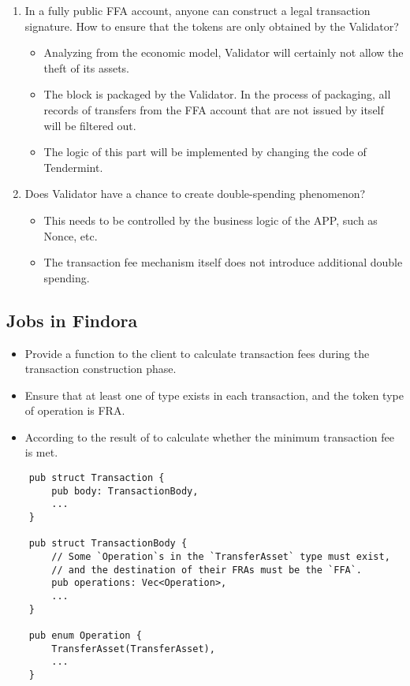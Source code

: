 \begin{enumerate}
    \item In a fully public FFA account, anyone can construct a legal transaction signature.
            How to ensure that the tokens are only obtained by the Validator?
        \begin{itemize}
            \item Analyzing from the economic model, Validator will certainly not allow the theft of its assets.
            \item The block is packaged by the Validator. In the process of packaging,
                    all records of transfers from the FFA account that are not issued by itself will be filtered out.
            \item The logic of this part will be implemented by changing the code of Tendermint.
        \end{itemize}
    \item Does Validator have a chance to create double-spending phenomenon?
        \begin{itemize}
            \item This needs to be controlled by the business logic of the APP, such as Nonce, etc.
            \item The transaction fee mechanism itself does not introduce additional double spending.
        \end{itemize}
\end{enumerate}

\subsection{Jobs in Findora}

\begin{itemize}
    \item Provide a function to the client to calculate transaction fees
            during the transaction construction phase.
    \item Ensure that at least one  of type 
            exists in each transaction, and the token type of operation is FRA.
    \item According to the result of 
            to calculate whether the minimum transaction fee is met.
\end{itemize}

\begin{lstlisting}
    pub struct Transaction {
        pub body: TransactionBody,
        ...
    }

    pub struct TransactionBody {
        // Some `Operation`s in the `TransferAsset` type must exist,
        // and the destination of their FRAs must be the `FFA`.
        pub operations: Vec<Operation>,
        ...
    }

    pub enum Operation {
        TransferAsset(TransferAsset),
        ...
    }
\end{lstlisting}

